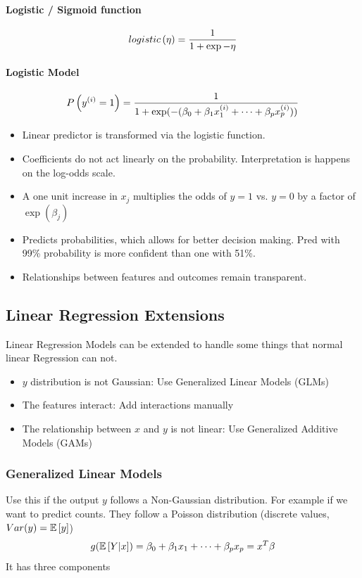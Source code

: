 \paragraph{Logistic / Sigmoid function}
\begin{equation}
	logistic\left (\eta\right) = \frac{1}{1+ \exp{-\eta}}
	\label{eq:Log-sigmoid-fun}
\end{equation}

\paragraph{Logistic Model}
\begin{equation}
	P\left (y^{(i)} = 1\right)  = \frac{1}{1 + \exp (- (\beta_0 + \beta_1 x_1^{(i)} + \dots + \beta_p x_p^{(i)}))}
	\label{eq:logisticregression}
\end{equation}
\begin{itemize}
	\item Linear predictor is transformed via the logistic function.
	\item Coefficients do not act linearly on the probability. Interpretation is happens on the log-odds scale.
	\item A one unit increase in $x_j$ multiplies the odds of $y=1$ vs. $y=0$ by a factor of $\exp(\beta_j)$
	\item Predicts probabilities, which allows for better decision making. Pred with 99\% probability is more confident than one with 51\%.
	\item Relationships between features and outcomes remain transparent.
\end{itemize}

\subsection{Linear Regression Extensions}
Linear Regression Models can be extended to handle some things that normal linear Regression can not.
\begin{itemize}
	\item $y$ distribution is not Gaussian: Use Generalized Linear Models (GLMs)
	\item The features interact: Add interactions manually
	\item The relationship between $x$ and $y$ is not linear: Use Generalized Additive Models (GAMs)
\end{itemize}

\subsubsection{Generalized Linear Models}
Use this if the output $y$ follows a Non-Gaussian distribution.
For example if we want to predict counts. They follow a Poisson distribution (discrete values, $Var(y) = \mathbb{E}\left[ y \right]$)
\begin{equation}
	g(\mathbb{E}\left[ Y|x \right]) = \beta_0 + \beta_1x_1 +  \dots + \beta_p x_p = x^T\beta
	\label{eq:GLM-formula}
\end{equation}
It has three components

